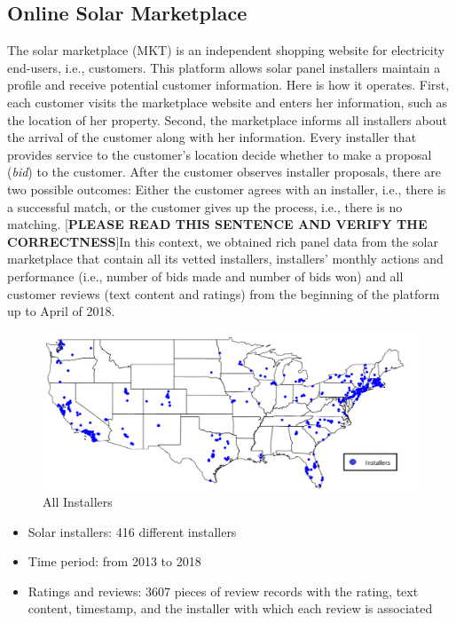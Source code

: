 \documentclass[msom,blindrev]{informs3}
\begin{document}
\subsection{Online Solar Marketplace}

The solar marketplace (MKT) is an independent shopping website for electricity end-users, i.e., customers. This platform allows solar panel installers maintain a profile and receive potential customer information. Here is how it operates. First, each customer visits the marketplace website and enters her information, such as the location of her property. Second, the marketplace informs all installers about the arrival of the customer along with her information. Every installer that provides service to the customer's location decide whether to make a proposal (\emph{bid}) to the customer. After the customer observes installer proposals, there are two possible outcomes: Either the customer agrees with an installer, i.e., there is a successful match, or the customer gives up the process, i.e., there is no matching.
[\textbf{PLEASE READ THIS SENTENCE AND VERIFY THE CORRECTNESS}]In this context, we obtained rich panel data from the solar marketplace that contain all its vetted installers, installers' monthly actions and performance (i.e., number of bids made and number of bids won) and all customer reviews (text content and ratings) from the beginning of the platform up to April of 2018.
\begin{figure}
	\centering
	\includegraphics[width=1.1\linewidth]{national_installers.png}
	\caption{All Installers}
	\label{fig:nationalinstallers}
\end{figure}
\begin{itemize}
\item Solar installers: 416 different installers
\item Time period: from 2013 to 2018
\item Ratings and reviews: 3607 pieces of review records with the rating, text content, timestamp, and the installer with which each review is associated
\end{itemize}
\end{document}
